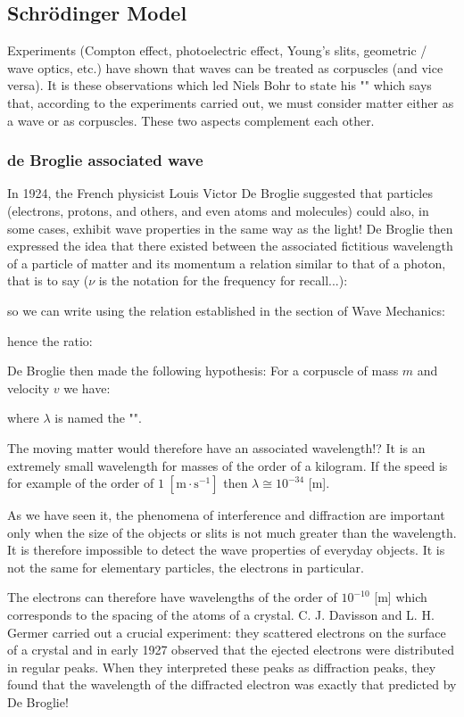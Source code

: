 	\subsection{Schrödinger Model}
	Experiments (Compton effect, photoelectric effect, Young's slits, geometric / wave optics, etc.) have shown that waves can be treated as corpuscles (and vice versa). It is these observations which led Niels Bohr to state his "" which says that, according to the experiments carried out, we must consider matter either as a wave or as corpuscles. These two aspects complement each other.
	
	\subsubsection{de Broglie associated wave}
	In 1924, the French physicist Louis Victor De Broglie suggested that particles (electrons, protons, and others, and even atoms and molecules) could also, in some cases, exhibit wave properties in the same way as the light! De Broglie then expressed the idea that there existed between the associated fictitious wavelength of a particle of matter and its momentum a relation similar to that of a photon, that is to say ($\nu$ is the notation for the frequency for recall...):
	
	so we can write using the relation established in the section of Wave Mechanics:
	
	hence the ratio:
	
	De Broglie then made the following hypothesis: For a corpuscle of mass $m$ and velocity $v$ we have:
	
	where $\lambda$ is named the "".
	
	The moving matter would therefore have an associated wavelength!? It is an extremely small wavelength for masses of the order of a kilogram. If the speed is for example of the order of $1\;[\text{m}\cdot\text{s}^{-1}]$ then $\lambda\cong 10^{-34}$ [m].

	As we have seen it, the phenomena of interference and diffraction are important only when the size of the objects or slits is not much greater than the wavelength. It is therefore impossible to detect the wave properties of everyday objects. It is not the same for elementary particles, the electrons in particular.
	
	The electrons can therefore have wavelengths of the order of $10^{-10}$ [m] which corresponds to the spacing of the atoms of a crystal. C. J. Davisson and L. H. Germer carried out a crucial experiment: they scattered electrons on the surface of a crystal and in early 1927 observed that the ejected electrons were distributed in regular peaks. When they interpreted these peaks as diffraction peaks, they found that the wavelength of the diffracted electron was exactly that predicted by De Broglie!
	
